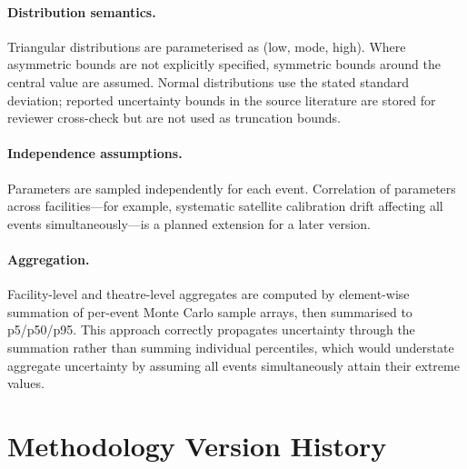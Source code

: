 \documentclass[11pt]{article}
\begin{document}
\paragraph{Distribution semantics.}
Triangular distributions are parameterised as (low, mode, high). Where
asymmetric bounds are not explicitly specified, symmetric bounds around the
central value are assumed. Normal distributions use the stated standard
deviation; reported uncertainty bounds in the source literature are stored
for reviewer cross-check but are not used as truncation bounds.

\paragraph{Independence assumptions.}
Parameters are sampled independently for each event. Correlation of
parameters across facilities---for example, systematic satellite calibration
drift affecting all events simultaneously---is a planned extension for a
later version.

\paragraph{Aggregation.}
Facility-level and theatre-level aggregates are computed by element-wise
summation of per-event Monte Carlo sample arrays, then summarised to
p5/p50/p95. This approach correctly propagates uncertainty through the
summation rather than summing individual percentiles, which would
understate aggregate uncertainty by assuming all events simultaneously
attain their extreme values.

\section{Methodology Version History}
\label{sec:versions}
\end{document}
